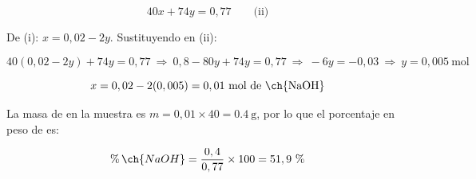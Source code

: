 \begin{exercise}
\begin{solu}
        \begin{equation*}
            40 x + 74 y = 0,77 \qquad \text{(ii)}
        \end{equation*}

        De (i): \(x = 0,02 - 2y\). Sustituyendo en (ii):

        \begin{equation*}
            40(0,02-2y) + 74y = 0,77 \ \Rightarrow \ 0,8 - 80y + 74y = 0,77 \ \Rightarrow \ -6y = -0,03 \ \Rightarrow \ y = 0,005 \ \text{mol}
        \end{equation*}

        \begin{equation*}
            x = 0,02 - 2(0,005) = 0,01 \ \text{mol de \ch{NaOH}}
        \end{equation*}

        La masa de  en la muestra es \(m = 0,01 \times 40 = \SI{0.4}{\gram}\), por lo que el porcentaje en peso de  es:

        \begin{equation*}
            \%\, \ch{NaOH} = \dfrac{0,4}{0,77} \times 100 = 51,9\ \%
        \end{equation*}

    \end{solu}
\end{exercise}

